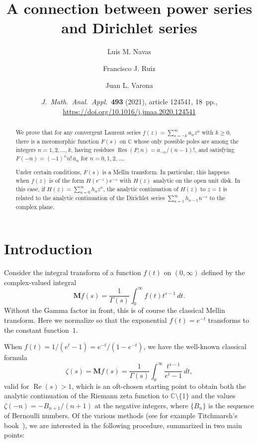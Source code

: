 \documentclass[11pt,a4paper]{amsart}
\date{\textit{J.\ Math.\ Anal.\ Appl.}\ \textbf{493} (2021), article 124541, 18~pp., 
\url{https://doi.org/10.1016/j.jmaa.2020.124541}}
\title[A connection between power series and Dirichlet series]%
{A connection between power series and Dirichlet series}
\author[L.~M.~Navas]{Luis M. Navas}
\author[F.~J.~Ruiz]{Francisco J. Ruiz}
\author[J.~L.~Varona]{Juan L. Varona}
\newcommand{\C}{\mathbb{C}}
\renewcommand{\Re}{\operatorname{Re}}
\newcommand{\Res}{\operatorname{Res}}
\newcommand{\M}{\mathbf{M}}
\theoremstyle{plain}
\theoremstyle{plain}
\theoremstyle{plain}
\theoremstyle{definition}
\theoremstyle{remark}
\begin{document}

\begin{abstract}
We prove that for any convergent Laurent series $f(z) = \sum_{n=-k}^{\infty} a_{n} z^{n}$ with $k \geq 0$, there is a meromorphic function $F(s)$ on $\C$ whose only possible poles are among the integers $n=1,2,\ldots,k$, having residues $\Res(F;n) = {a_{-n}}/{(n-1)!}$, and satisfying $F(-n) = (-1)^{n} n!\, a_{n}$ for $n=0,1,2,\ldots$.

Under certain conditions, $F(s)$ is a Mellin transform. In particular,  this happens when $f(z)$ is of the form $H(e^{-z})e^{-z}$ with $H(z)$ analytic on the open unit disk. In this case, if $H(z) = \sum_{n=0}^{\infty} h_{n} z^{n}$, the analytic continuation of $H(z)$ to $z=1$ is related to the analytic continuation of the Dirichlet series $\sum_{n=1}^{\infty} h_{n-1} n^{-s}$ to the complex plane.
\end{abstract}

\maketitle

\section{Introduction}
\label{sec:introduction}

Consider the integral transform of a function $f(t)$ on $(0,\infty)$ defined by the complex-valued integral
\begin{equation}
\label{eq:Mellin}
  \M{f}(s) = \frac{1}{\Gamma(s)}\int_{0}^{\infty} f(t)t^{s-1} \, dt.
\end{equation}
Without the Gamma factor in front, this is of course the classical Mellin transform. Here we normalize so that the exponential $f(t) = e^{-t}$ transforms to the constant function~$1$.

When $f(t) = 1/(e^{t}-1) = e^{-t}/(1 - e^{-t})$, we have the well-known classical formula
\[
  \zeta(s) = \M{f}(s)
  = \frac{1}{\Gamma(s)} \int_{0}^{\infty} \frac{t^{s-1}}{e^{t} - 1} \, dt,
\]
valid for $\Re(s) > 1$, which is an oft-chosen starting point to obtain both the analytic continuation of the Riemann zeta function to $\C \setminus \{1\}$ and the values $\zeta(-n) = -B_{n+1}/(n+1)$ at the negative integers, where $\{B_{n}\}$ is the sequence of Bernoulli numbers. Of the various methods (see for example Titchmarsh's book~\cite{Titchmarsh}), we are interested in the following procedure, summarized in two main points:
 
\end{document}
